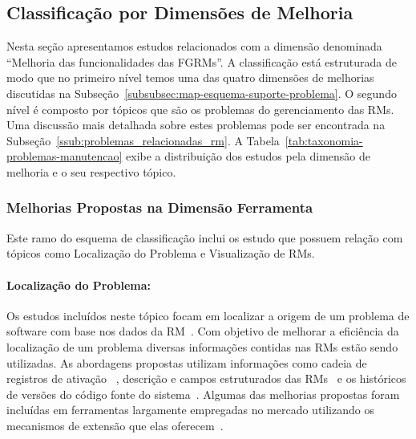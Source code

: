 \subsection{Classificação por Dimensões de Melhoria}
\label{sub:extensões_para_problemas_na_manutenção_de_software}

Nesta seção apresentamos estudos relacionados com a dimensão denominada
``Melhoria das funcionalidades das FGRMs\@''. A classificação está estruturada
de modo que no primeiro nível temos uma das quatro dimensões de melhorias
discutidas na Subseção~\ref{subsubsec:map-esquema-suporte-problema}. O segundo
nível é composto por tópicos que são os problemas do gerenciamento das RMs. Uma
discussão mais detalhada sobre estes problemas pode ser encontrada na
Subseção~\ref{ssub:problemas_relacionadas_rm}. A
Tabela~\ref{tab:taxonomia-problemas-manutencao} exibe a distribuição dos estudos
pela dimensão de melhoria e o seu respectivo tópico.



\subsubsection{Melhorias Propostas na Dimensão Ferramenta}
\label{ssub:melhorias_dim_ferramenta}

Este ramo do esquema de classificação inclui os estudo que possuem relação com
tópicos como Localização do Problema e Visualização de RMs.

\paragraph{Localização do Problema:}

Os estudos incluídos neste tópico focam em localizar a origem de um problema de
software com base nos dados da RM~\cite{Hovemeyer:2004:FBE:1052883.1052895}. Com
objetivo de melhorar a eficiência da localização de um problema diversas
informações contidas nas RMs estão sendo utilizadas. As abordagens propostas
utilizam informações como cadeia de registros de ativação
~\cite{Wong:2014:BBF:2705615.2706096}, des\-cri\-ção e campos estruturados das
RMs~\cite{Thung:2014:BIT:2635868.2661678} e os históricos de versões do código
fonte do sistema~\cite{Bangcharoensap:2012:LSC:2419061.2419428,
    corley2011recovering, Romo:2015:TAT:2745802.2745833}. Algumas das melhorias
propostas foram incluídas em ferramentas largamente empregadas no mercado
utilizando os mecanismos de extensão que elas
oferecem~\cite{Thung:2014:BIT:2635868.2661678,corley2011recovering}.

